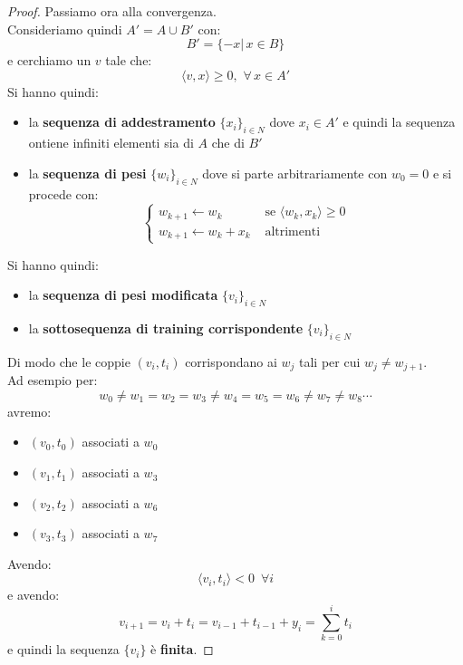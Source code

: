 \documentclass[a4paper,12pt, oneside]{book}
\begin{document}
\begin{proof}
  Passiamo ora alla convergenza.\\
  Consideriamo quindi $A'=A\cup B'$ con:
  \[B'=\{-x|\,x\in B\}\]
  e cerchiamo un $v$ tale che:
  \[\langle v, x\rangle\geq 0,\,\,\forall\,x\in A'\]
  Si hanno quindi:
  \begin{itemize}
    \item la \textbf{sequenza di addestramento} $\{x_i\}_{i\in N}$ dove $x_i\in
    A'$ e quindi la sequenza ontiene infiniti elementi sia di $A$ che di $B'$
    \item la \textbf{sequenza di pesi} $\{w_i\}_{i\in N}$ dove si parte
    arbitrariamente con $w_0=0$ e si procede con:
    \[
      \begin{cases}
        w_{k+1}\gets w_k &\mbox{ se }\langle w_k, x_k\rangle\geq 0\\
        w_{k+1}\gets w_k+x_k&\mbox{ altrimenti}
      \end{cases}
    \]
  \end{itemize}
  Si hanno quindi:
  \begin{itemize}
    \item la \textbf{sequenza di pesi modificata} $\{v_i\}_{i\in N}$ 
    \item la \textbf{sottosequenza di training corrispondente} $\{v_i\}_{i\in N}$ 
  \end{itemize}
  Di modo che le coppie $(v_i,t_i)$ corrispondano ai $w_j$ tali per cui $w_j\neq
  w_{j+1}$.\\
  Ad esempio per:
  \[w_0\neq w_1=w_2=w_3\neq w_4=w_5=w_6\neq w_7\neq w_8\cdots\]
  avremo:
  \begin{itemize}
    \item $(v_0,t_0)$ associati a $w_0$
    \item $(v_1,t_1)$ associati a $w_3$
    \item $(v_2,t_2)$ associati a $w_6$
    \item $(v_3,t_3)$ associati a $w_7$
  \end{itemize}
  Avendo:
  \[\langle v_i,t_i\rangle<0\,\,\,\forall i\]
  e avendo:
  \[v_{i+1}=v_i+t_i=v_{i-1}+t_{i-1}+y_i=\sum_{k=0}^i t_i\]
  e quindi la sequenza $\{v_i\}$ è \textbf{finita}.
\end{proof}
\end{document}
